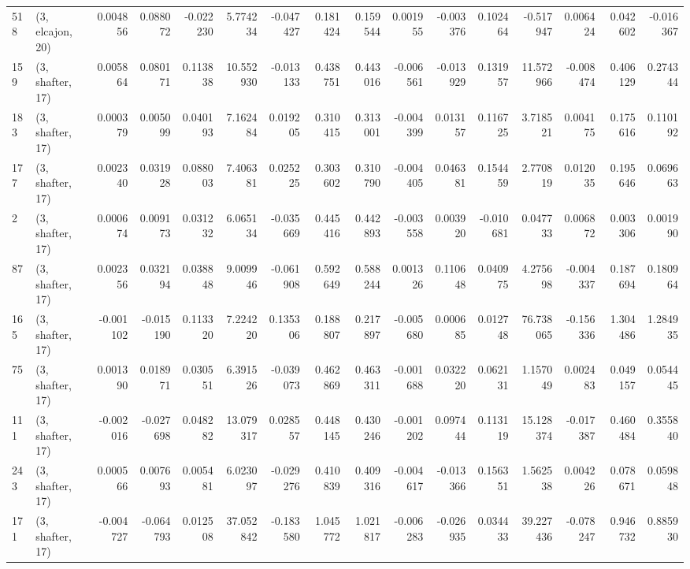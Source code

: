 \begin{tabular}{llrrrrrrrrrrrrrr}
518 &  (3, elcajon, 20) &   0.004856 &  0.088072 & -0.022230 &    5.774234 & -0.047427 &   0.181424 &   0.159544 &  0.001955 & -0.003376 &  0.102464 &   -0.517947 &  0.006424 &   0.042602 &  -0.016367 \\
159 &  (3, shafter, 17) &   0.005864 &  0.080171 &  0.113838 &   10.552930 & -0.013133 &   0.438751 &   0.443016 & -0.006561 & -0.013929 &  0.131957 &   11.572966 & -0.008474 &   0.406129 &   0.274344 \\
183 &  (3, shafter, 17) &   0.000379 &  0.005099 &  0.040193 &    7.162484 &  0.019205 &   0.310415 &   0.313001 & -0.004399 &  0.013157 &  0.116725 &    3.718521 &  0.004175 &   0.175616 &   0.110192 \\
177 &  (3, shafter, 17) &   0.002340 &  0.031928 &  0.088003 &    7.406381 &  0.025225 &   0.303602 &   0.310790 & -0.004405 &  0.046381 &  0.154459 &    2.770819 &  0.012035 &   0.195646 &   0.069663 \\
2   &  (3, shafter, 17) &   0.000674 &  0.009173 &  0.031232 &    6.065134 & -0.035669 &   0.445416 &   0.442893 & -0.003558 &  0.003920 & -0.010681 &    0.047733 &  0.006872 &   0.003306 &   0.001990 \\
87  &  (3, shafter, 17) &   0.002356 &  0.032194 &  0.038848 &    9.009946 & -0.061908 &   0.592649 &   0.588244 &  0.001326 &  0.110648 &  0.040975 &    4.275698 & -0.004337 &   0.187694 &   0.180964 \\
165 &  (3, shafter, 17) &  -0.001102 & -0.015190 &  0.113320 &    7.224220 &  0.135306 &   0.188807 &   0.217897 & -0.005680 &  0.000685 &  0.012748 &   76.738065 & -0.156336 &   1.304486 &   1.284935 \\
75  &  (3, shafter, 17) &   0.001390 &  0.018971 &  0.030551 &    6.391526 & -0.039073 &   0.462869 &   0.463311 & -0.001688 &  0.032220 &  0.062131 &    1.157049 &  0.002483 &   0.049157 &   0.054445 \\
111 &  (3, shafter, 17) &  -0.002016 & -0.027698 &  0.048282 &   13.079317 &  0.028557 &   0.448145 &   0.430246 & -0.001202 &  0.097444 &  0.113119 &   15.128374 & -0.017387 &   0.460484 &   0.355840 \\
243 &  (3, shafter, 17) &   0.000566 &  0.007693 &  0.005481 &    6.023097 & -0.029276 &   0.410839 &   0.409316 & -0.004617 & -0.013366 &  0.156351 &    1.562538 &  0.004226 &   0.078671 &   0.059848 \\
171 &  (3, shafter, 17) &  -0.004727 & -0.064793 &  0.012508 &   37.052842 & -0.183580 &   1.045772 &   1.021817 & -0.006283 & -0.026935 &  0.034433 &   39.227436 & -0.078247 &   0.946732 &   0.885930 \\

\end{tabular}
